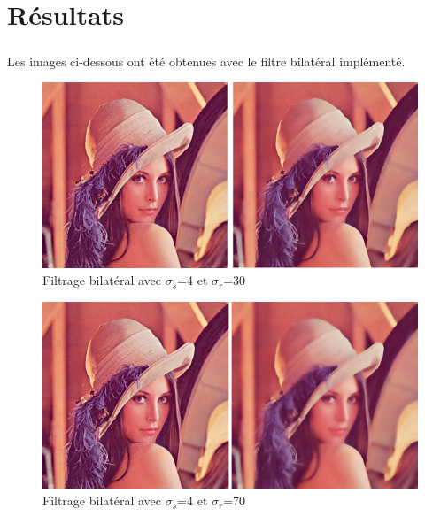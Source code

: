 \documentclass[twoside,UTF8]{EPURapport}
\begin{document}
\chapter{Résultats}

\paragraph{}
Les images ci-dessous ont été obtenues avec le filtre bilatéral implémenté. 

\begin{figure}[H]
	\begin{center} 
		\includegraphics[scale=0.7]{images/lena_4_30.png} 
	\end{center} 
	\caption{Filtrage bilatéral avec $\sigma_s$=4 et $\sigma_r$=30 }
\end{figure} 

\begin{figure}[H]
	\begin{center} 
		\includegraphics[scale=0.7]{images/lena_4_70.png} 
	\end{center} 
	\caption{Filtrage bilatéral avec $\sigma_s$=4 et $\sigma_r$=70 }
\end{figure} 
\end{document}
